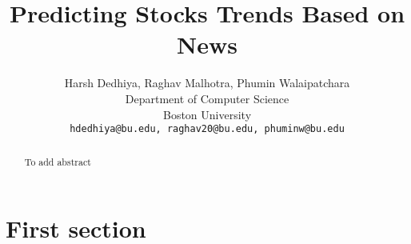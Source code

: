 \documentclass{article}
\title{Predicting Stocks Trends Based on News}
\author{
Harsh Dedhiya, Raghav Malhotra, Phumin Walaipatchara\\
Department of Computer Science\\
Boston University\\
\texttt{hdedhiya@bu.edu, raghav20@bu.edu, phuminw@bu.edu}\\
}
\begin{document}
\maketitle
\begin{abstract}
    To add abstract
\end{abstract}
\section{First section}
\end{document}
